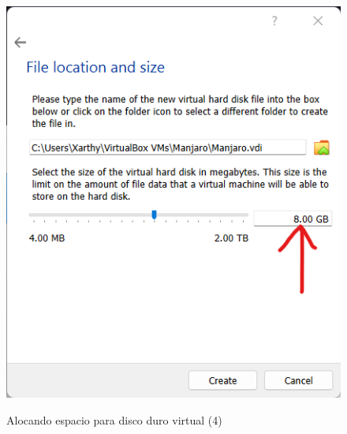 \documentclass[stu, 12pt, letterpaper, donotrepeattitle, floatsintext, natbib, helv]{apa7}
\begin{document}
\begin{enumerate}
\begin{figure}[H]
        \includegraphics[width = 1\textwidth]{VirtualHardDiskCreation4.png} \\
        \caption{Alocando espacio para disco duro virtual (4)}
        \label{fig:VHDD4}
    \end{figure}
\end{enumerate}

\end{document}
